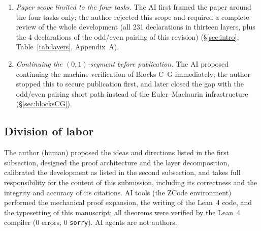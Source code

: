 \documentclass{article}
\begin{document}
\begin{enumerate}
author had bridged the Stirling phase, the AI still proposed an asymptotic
route; the author rejected it and required a fast path quoting known curves
(``we are already bridged, why still asymptotics'')
(\S\ref{sec:methodology}, \S\ref{sec:boundary}).
\item \emph{Paper scope limited to the four tasks.} The AI first framed the
paper around the four tasks only; the author rejected this scope and
required a complete review of the whole development (all 231 declarations
in thirteen layers, plus the 4 declarations of the odd/even pairing of this
revision) (\S\ref{sec:intro}, Table~\ref{tab:layers},
Appendix~A).
\item \emph{Continuing the $(0,1)$-segment before publication.} The AI
proposed continuing the machine verification of Blocks C--G immediately;
the author stopped this to secure publication first, and later closed the
gap with the odd/even pairing short path instead of the Euler--Maclaurin
infrastructure (\S\ref{sec:blocksCG}).
\end{enumerate}

\subsection*{Division of labor}
The author (human) proposed the ideas and directions listed in the first
subsection, designed the proof architecture and the layer decomposition,
calibrated the development as listed in the second subsection, and takes
full responsibility for the content of this submission, including its
correctness and the integrity and accuracy of its citations. AI tools (the
ZCode environment) performed the mechanical proof expansion, the writing of
the Lean~4 code, and the typesetting of this manuscript; all theorems were
verified by the Lean~4 compiler (0 errors, 0 \texttt{sorry}). AI agents are
not authors.
\end{document}

